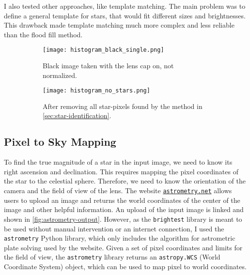 I also tested other approaches, like template matching. The main problem was to define a
general template for stars, that would fit different sizes and brightnesses. This drawback
made template matching much more complex and less reliable than the flood fill method.

\begin{figure}[tb]
  \centering
  \begin{subfigure}{.49\textwidth}
    \centering
    \texttt{[image: histogram\_black\_single.png]}
    \caption{Black image taken with the lens cap on, not normalized.}
    \label{fig:black-histogram}
  \end{subfigure}%
  \hfill
  \begin{subfigure}{.49\textwidth}
    \centering
    \texttt{[image: histogram\_no\_stars.png]}
    \caption{After removing all star-pixels found by the method in \autoref{sec:star-identification}.}
    \label{fig:after-removing-stars}
  \end{subfigure}
  \caption{}
  \label{fig:removing-stars}
\end{figure}

\subsection{Pixel to Sky Mapping}
\label{sec:pixel-to-sky-mapping}

To find the true magnitude of a star in the input image, we need to know its right
ascension and declination. This requires mapping the pixel coordinates of the star to the
celestial sphere. Therefore, we need to know the orientation of the camera and the field
of view of the lens. The website
\href{https://nova.astrometry.net}{\texttt{astrometry.net}} \cite{astrometry2010} allows
users to upload an image and returns the world coordinates of the center of the image and
other helpful information. An upload of the input image is linked and shown in
\autoref{fig:astrometry-output}. However, as the \texttt{brightest} library is meant to be
used without manual intervention or an internet connection, I used the \texttt{astrometry}
Python library, which only includes the algorithm for astrometric plate solving used by
the website. Given a set of pixel coordinates and limits for the field of view, the
\texttt{astrometry} library returns an \texttt{astropy.WCS} (World Coordinate System)
object, which can be used to map pixel to world coordinates.

